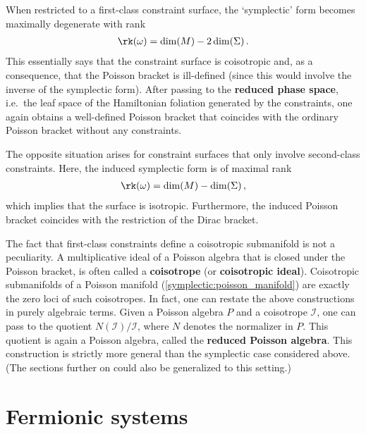     \begin{property}
        When restricted to a first-class constraint surface, the `symplectic' form becomes maximally degenerate with rank
        \begin{gather}
            \rk(\omega) = \dim(M) - 2\dim(\Sigma)\,.
        \end{gather}
        This essentially says that the constraint surface is coisotropic and, as a consequence, that the Poisson bracket is ill-defined (since this would involve the inverse of the symplectic form). After passing to the \textbf{reduced phase space}, i.e.~the leaf space of the Hamiltonian foliation generated by the constraints, one again obtains a well-defined Poisson bracket that coincides with the ordinary Poisson bracket without any constraints.

        The opposite situation arises for constraint surfaces that only involve second-class constraints. Here, the induced symplectic form is of maximal rank
        \begin{gather}
            \rk(\omega) = \dim(M) - \dim(\Sigma)\,,
        \end{gather}
        which implies that the surface is isotropic. Furthermore, the induced Poisson bracket coincides with the restriction of the Dirac bracket.
    \end{property}
    \begin{remark}
        The fact that first-class constraints define a coisotropic submanifold is not a peculiarity. A multiplicative ideal of a Poisson algebra that is closed under the Poisson bracket, is often called a \textbf{coisotrope} (or \textbf{coisotropic ideal}). Coisotropic submanifolds of a Poisson manifold  (\cref{symplectic:poisson_manifold}) are exactly the zero loci of such coisotropes. In fact, one can restate the above constructions in purely algebraic terms. Given a Poisson algebra $P$ and a coisotrope $\mathcal{I}$, one can pass to the quotient $N(\mathcal{I})/\mathcal{I}$, where $N$ denotes the normalizer in $P$. This quotient is again a Poisson algebra, called the \textbf{reduced Poisson algebra}. This construction is strictly more general than the symplectic case considered above. (The sections further on could also be generalized to this setting.)
    \end{remark}

\section{Fermionic systems}

